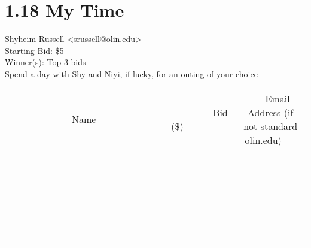 \documentclass[11pt]{article}
\begin{document}
					\section*{1.18 My Time}
					Shyheim Russell <srussell@olin.edu> \\
					Starting Bid: \$5 \\
					Winner(s): Top 3 bids \\
					Spend a day with Shy and Niyi, if lucky, for an outing of your choice \\
					[6ex]
					\begin{tabular}{c c c}
						~~~~~~~~~~~~~Name~~~~~~~~~~~~~ & ~~~~~~~~~Bid (\$)~~~~~~~~~ & ~~~Email Address (if not standard olin.edu)~~~ \\
				
 & & \\
\hline
 & & \\
\hline
 & & \\
\hline
 & & \\
\hline
 & & \\
\hline
 & & \\
\hline
 & & \\
\hline
 & & \\
\hline
 & & \\
\hline
 & & \\
\hline
 & & \\
\hline
 & & \\
\hline
 & & \\
\hline
 & & \\
\hline
 & & \\
\hline
 & & \\
\hline
 & & \\
\hline
 & & \\
\hline
 & & \\
\hline
 & & \\
\hline
 & & \\
\hline
 & & \\
\hline
 & & \\
\hline
 & & \\
\hline
 & & \\
\hline
 & & \\
\hline
					\end{tabular}
					\clearpage
				
\end{document}
